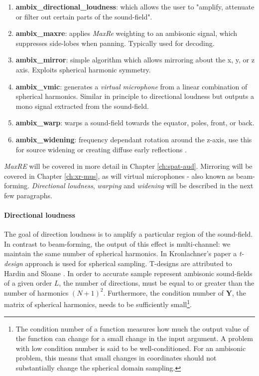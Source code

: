\begin{enumerate}
    \item \textbf{ambix\_directional\_loudness}: which allows the user to "amplify, attenuate or filter out certain parts of the sound-field". 
    \item \textbf{ambix\_maxre}: applies \textit{MaxRe} weighting to an ambisonic signal, which suppresses side-lobes when panning. Typically used for decoding.
    \item \textbf{ambix\_mirror}: simple algorithm which allows mirroring about the x, y, or z axis. Exploits spherical harmonic symmetry.
    \item \textbf{ambix\_vmic}: generates a \textit{virtual microphone} from a linear combination of spherical harmonics. Similar in principle to directional loudness but outputs a mono signal extracted from the sound-field. 
    \item \textbf{ambix\_warp}: warps a sound-field towards the equator, poles, front, or back. 
    \item \textbf{ambix\_widening}: frequency dependant rotation around the z-axis, use this for source widening or creating diffuse early reflections \cite{zotter2014efficient}.
\end{enumerate}

\textit{MaxRE} will be covered in more detail in Chapter \ref{ch:spat-aud}. Mirroring will be covered in Chapter \ref{ch:xr-mus}, as will virtual microphones - also known as beam-forming. \textit{Directional loudness}, \textit{warping} and \textit{widening} will be described in the next few paragraphs. 

\paragraph{Directional loudness}\label{par:dir-ldnss}

The goal of direction loudness is to amplify a particular region of the sound-field. In contrast to beam-forming, the output of this effect is multi-channel: we maintain the same number of spherical harmonics. In Kronlachner's paper \cite{kronlachner2014spatial} a \textit{t-design} approach is used for spherical sampling. T-designs are attributed to Hardin and Sloane \cite{hardin1996mclaren}. In order to accurate sample represent ambisonic sound-fields of a given order $L$, the number of directions, must be equal to or greater than the number of harmonics $(N +1)^2$. Furthermore, the condition number of $\mathbf{Y}$, the matrix of spherical harmonics, needs to be sufficiently small\footnote{The condition number of a function measures how much the output value of the function can change for a small change in the input argument. A problem with low condition number is said to be well-conditioned. For an ambisonic problem, this means that small changes in coordinates should not substantially change the spherical domain sampling.}. 

